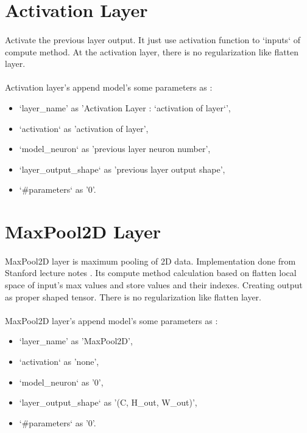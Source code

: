 \documentclass[12pt]{report}
\begin{document}
\section{Activation Layer}

\paragraph{}
Activate the previous layer output. It just use activation function to `inputs` of compute method. At the activation layer, there is no regularization like flatten layer.

\paragraph{}
Activation layer's append model's some parameters as :

\begin{itemize}
	\item `layer\_name' as 'Activation Layer : `activation of layer`',
	\item `activation` as 'activation of layer',
	\item `model\_neuron` as 'previous layer neuron number',
	\item `layer\_output\_shape` as 'previous layer output shape',
	\item `\#parameters` as '0'.
\end{itemize}



\section{MaxPool2D Layer}

\paragraph{}
MaxPool2D layer is maximum pooling of 2D data. Implementation done from Stanford lecture notes \cite{cs231}. Its compute method calculation based on flatten local space of input's max values and store values and their indexes. Creating output as proper shaped tensor. There is no regularization like flatten layer.

\paragraph{}
MaxPool2D layer's append model's some parameters as :
\begin{itemize}
	\item `layer\_name' as 'MaxPool2D',
	\item `activation` as 'none',
	\item `model\_neuron` as '0',
	\item `layer\_output\_shape` as '(C, H\_out, W\_out)',
	\item `\#parameters` as '0'.
\end{itemize}
\end{document}
